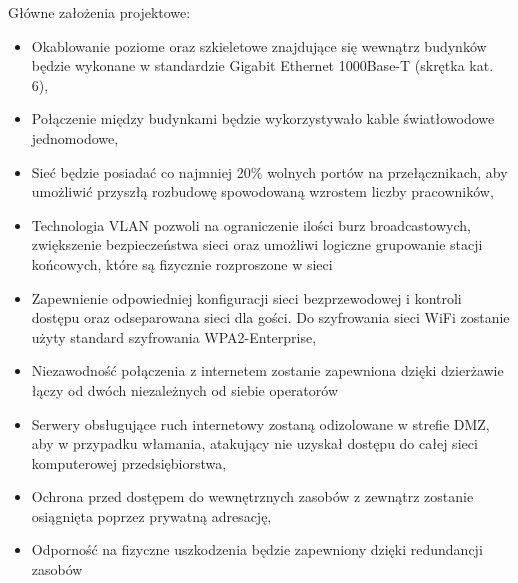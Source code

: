 \documentclass[12pt,a4paper,titlepage]{article}
\begin{document}
Główne założenia projektowe:
\begin{itemize}
    \item Okablowanie poziome oraz szkieletowe znajdujące się wewnątrz budynków będzie wykonane w standardzie Gigabit Ethernet 1000Base-T (skrętka kat. 6),
    \item Połączenie między budynkami będzie wykorzystywało kable światłowodowe jednomodowe,
    \item Sieć będzie posiadać co najmniej 20\% wolnych portów na przełącznikach, aby umożliwić przyszłą rozbudowę spowodowaną wzrostem liczby pracowników,
    \item Technologia VLAN pozwoli na ograniczenie ilości burz broadcastowych, zwiększenie bezpieczeństwa sieci oraz umożliwi logiczne grupowanie stacji końcowych, które są fizycznie rozproszone w sieci
    \item Zapewnienie odpowiedniej konfiguracji sieci bezprzewodowej i kontroli dostępu oraz odseparowana sieci dla gości. Do szyfrowania sieci WiFi zostanie użyty standard szyfrowania WPA2-Enterprise,
    \item Niezawodność połączenia z internetem zostanie zapewniona dzięki dzierżawie łączy od dwóch niezależnych od siebie operatorów
    \item Serwery obsługujące ruch internetowy zostaną odizolowane w strefie DMZ, aby  w przypadku  włamania,  atakujący  nie  uzyskał  dostępu  do  całej  sieci komputerowej przedsiębiorstwa,
    \item Ochrona  przed  dostępem do wewnętrznych zasobów z zewnątrz zostanie osiągnięta poprzez prywatną adresację,
    \item Odporność na fizyczne uszkodzenia będzie zapewniony dzięki redundancji zasobów
\end{itemize}

\newpage
\listoftables
\end{document}
